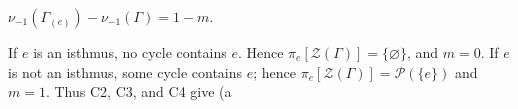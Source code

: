 $\nu_{-1}(\Gamma_{(e)}) - \nu_{-1}(\Gamma) = 1 - m.$

If $e$ is an isthmus, no cycle contains $e$. Hence $\pi_{e}[\mathcal{Z}(\Gamma)] = \{\varnothing\}$, and $m = 0$.
If $e$ is not an isthmus, some cycle contains $e$; hence $\pi_{e}[\mathcal{Z}(\Gamma)] = \mathcal{P}(\{e\})$ and $m = 1$. Thus C2, C3, and C4 give (a
